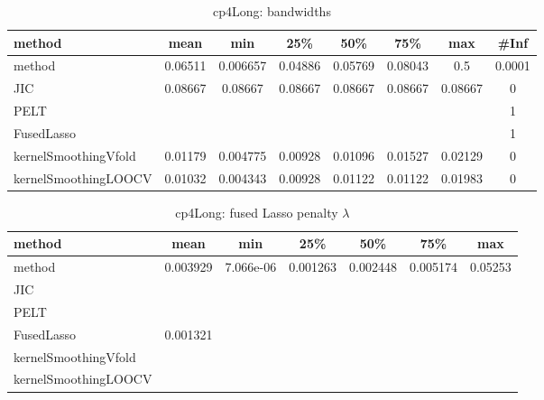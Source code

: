 \begin{table}[ht]
\centering
\begin{tabular}{l|c|ccccc|c}
  \hline
method & mean & min & 25\% & 50\% & 75\% & max & \#Inf \\ 
  \hline
method & 0.06511 & 0.006657 & 0.04886 & 0.05769 & 0.08043 &   0.5 & 0.0001 \\ 
  JIC & 0.08667 & 0.08667 & 0.08667 & 0.08667 & 0.08667 & 0.08667 &   0 \\ 
  PELT &  &  &  &  &  &  &   1 \\ 
  FusedLasso &  &  &  &  &  &  &   1 \\ 
  kernelSmoothingVfold & 0.01179 & 0.004775 & 0.00928 & 0.01096 & 0.01527 & 0.02129 &   0 \\ 
  kernelSmoothingLOOCV & 0.01032 & 0.004343 & 0.00928 & 0.01122 & 0.01122 & 0.01983 &   0 \\ 
   \hline
\end{tabular}
\caption{cp4Long: bandwidths} 
\label{tab:cp4LongBandwidths}
\end{table}
\begin{table}[ht]
\centering
\begin{tabular}{l|c|ccccc}
  \hline
method & mean & min & 25\% & 50\% & 75\% & max \\ 
  \hline
method & 0.003929 & 7.066e-06 & 0.001263 & 0.002448 & 0.005174 & 0.05253 \\ 
  JIC &  &  &  &  &  &  \\ 
  PELT &  &  &  &  &  &  \\ 
  FusedLasso & 0.001321 &  &  &  &  &  \\ 
  kernelSmoothingVfold &  &  &  &  &  &  \\ 
  kernelSmoothingLOOCV &  &  &  &  &  &  \\ 
   \hline
\end{tabular}
\caption{cp4Long: fused Lasso penalty $\lambda$} 
\label{tab:cp4LongLambdas}
\end{table}
